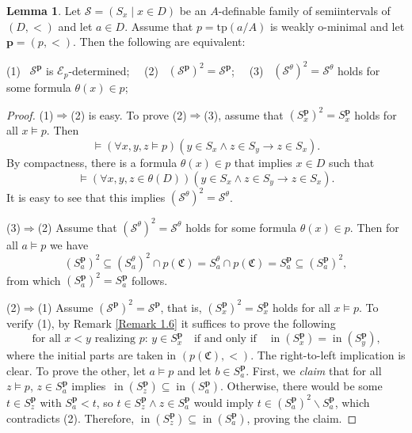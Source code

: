 \documentclass{amsart}
\theoremstyle{definition}
\newtheorem{Lemma}[Theorem]{Lemma}
\theoremstyle{definition}
\newcommand{\Mon}{\mathfrak C}
\newcommand{\tp}{\mathrm{tp}}
\def\pp{\mathbf{p}}
\DeclareMathOperator{\supin}{in}
\begin{document}
 
\begin{Lemma}\label{Lemma two conditions for S_a E_p determined}
Let $\mathcal S=(S_x\mid x\in D)$ be an $A$-definable family of semiintervals of $(D,<)$ and let $a\in D$. Assume that $p=\tp(a/A)$ is weakly o-minimal and let $\mathbf p=(p,<)$. Then the following are equivalent:

(1) \ $\mathcal S^{\mathbf p}$ is $\mathcal E_p$-determined; \ \
(2) \ $(\mathcal S^{\mathbf p})^2=\mathcal S^{\mathbf p}$; \ \ 
(3) \ $(\mathcal S^{\theta})^2=\mathcal S^\theta$ holds for some formula $\theta(x)\in p$; 
\end{Lemma}
\begin{proof} 
(1)$\Rightarrow$(2) is easy. To prove (2)$\Rightarrow$(3), assume that $(S^{\mathbf p}_x)^2= S^{\mathbf p}_x$ holds for all $x\models p$. Then
\[\models (\forall x,y,z\models p)(y\in S_x\land z\in S_y\rightarrow z\in S_x).\]
By compactness, there is a formula $\theta(x)\in p$ that implies $x\in D$ such that
\[\models (\forall x,y,z\in \theta(D))(y\in S_x\land z\in S_y\rightarrow z\in S_x).\]
It is easy to see that this implies $(\mathcal S^\theta)^2=\mathcal S^\theta$. 

\smallskip(3)$\Rightarrow$(2)  Assume that $(\mathcal S^{\theta})^2=\mathcal S^\theta$ holds for some formula $\theta(x)\in p$. Then for all $a\models p$ we have \[(S^\pp_a)^2\subseteq (S_a^\theta)^2\cap p(\Mon)= S_a^\theta\cap p(\Mon)= S^\pp_a\subseteq (S^\pp_a)^2,\] 
from which $(S^\pp_a)^2=S^\pp_a$ follows.

\smallskip
(2)$\Rightarrow$(1) Assume $(\mathcal S^{\mathbf p})^2=\mathcal S^{\mathbf p}$, that is, $(S^{\mathbf p}_x)^2= S^{\mathbf p}_x$ holds for all $x\models p$. To verify (1), by Remark \ref{Remark 1.6} it suffices to prove the following
\[
\mbox{for all $x<y$ realizing $p$: \ \ $y\in S^{\mathbf p}_x$ \ { if and only if } \  $\supin (S^{\mathbf p}_x)=\supin (S^{\mathbf p}_y)$,}
\]
where the initial parts are taken in $(p(\Mon),<)$. 
The right-to-left implication is clear. To prove the other, let $a\models p$ and let $b\in S^{\mathbf p}_a$. First, we {\it claim} that for all $z\models p$, $z\in S^{\mathbf p}_a$ implies\  $\supin (S^{\mathbf p}_z)\subseteq \supin (S^{\mathbf p}_a)$. Otherwise, there would be some $t\in S^{\mathbf p}_z$ with $S^{\mathbf p}_a<t$, so $t\in S^{\mathbf p}_z\land z\in S^{\mathbf p}_a$ would imply
$t\in (S^{\mathbf p}_a)^2\smallsetminus S^{\mathbf p}_a$, which contradicts (2). Therefore, $\supin (S^{\mathbf p}_z)\subseteq\supin (S^{\mathbf p}_a)$, proving the claim. 


\end{proof}
\end{document}

